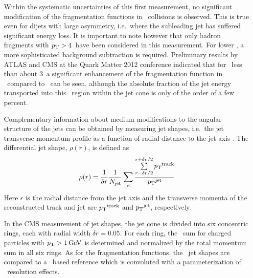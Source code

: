 Within the systematic uncertainties of this first measurement, no significant modification of
the fragmentation functions in \PbPb\ collisions is observed. This is true even for
dijets with large asymmetry, i.e.\ where the subleading jet has suffered significant
energy loss. It is important to note however that only hadron fragments
with $\mbox{$p_{\mathrm{T}}$} > 4$\GeVc\ have been considered in this measurement. For lower \pT, a more
sophisticated background subtraction is required. Preliminary results by ATLAS and CMS
at the Quark Matter 2012 conference indicated that for \pT\ less than about $3$\GeVc\ a
significant enhancement of the fragmentation function in \PbPb\ compared to \pp\ can be
seen, although the absolute fraction of the jet energy transported into this \pT\ region within
the jet cone is only of the order of a few percent.


Complementary information about medium modifications to the angular structure of the jets
can be obtained by measuring jet shapes, i.e.\ the
jet transverse momentum profile as a function of radial distance to the jet axis
\cite{MehtarTani:2010ma,Idilbi:2008vm,CasalderreySolana:2011rz,
CasalderreySolana:2011rq,Neufeld:2011yh,Blaizot:2012fh,Fickinger:2013xwa}.
The differential jet shape, $\rho(r)$, is defined as~\cite{Chatrchyan:2013kwa}
\begin{equation}
\rho(r) = \frac{1}{\delta r} \frac{1}{N_{\rm{jet}}} \sum_{\rm{jet}}
\frac{\sum\limits_{{r - \delta r/2}}^{{r + \delta r/2}}{\mbox{$p_{\mathrm{T}}$}^{\rm{track}}}}{\mbox{$p_{\mathrm{T}}$}^{\rm{jet}}}
\label{eq:rho(r)}
\end{equation}
Here $r$ is the radial distance from the jet axis
and the transverse momenta of the reconstructed track and jet are
$\mbox{$p_{\mathrm{T}}$}^{\rm{track}}$ and $\mbox{$p_{\mathrm{T}}$}^{\rm{jet}}$, respectively.

In the CMS measurement of jet shapes\cite{Chatrchyan:2013kwa}, the jet cone is divided
into six concentric rings, each with radial width $\delta r = 0.05$. For each
ring, the \pT\ sum for charged particles with $\mbox{$p_{\mathrm{T}}$} > 1\,\mathrm{GeV}$ is determined and
normalized by the total momentum sum in all six rings. As for the fragmentation
functions, the \PbPb\ jet shapes are compared to a \pp\ based reference which is
convoluted with a parameterization of \PbPb\ resolution effects.

